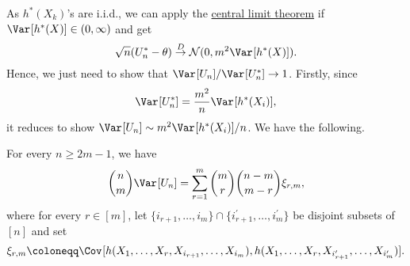 As \(h^{\ast} (X_k)\)'s are i.i.d., we can apply the \hyperref[thm:CLT]{central limit theorem} if \(\Var_{}[h^{\ast} (X)] \in (0, \infty )\) and get
\[
	\sqrt{n} (U_n^{\ast} - \theta ) \overset{D}{\to} \mathcal{N} (0, m^2 \Var_{}[h^{\ast} (X)] ).
\]
Hence, we just need to show that \(\Var_{}[U_n] / \Var_{}[U_n^{\ast} ] \to 1\). Firstly, since
\[
	\Var_{}[U_n^{\ast} ]
	= \frac{m^2}{n} \Var_{}[h^{\ast} (X_i)],
\]
it reduces to show \(\Var_{}[U_n] \sim m^2 \Var_{}[h^{\ast} (X_i)] / n\). We have the following.

\begin{proposition}\label{prop:U-statistic-variance}
	For every \(n \geq 2m - 1\), we have
	\[
		\binom{n}{m} \Var_{}[U_n]
		= \sum_{r=1}^{m} \binom{m}{r} \binom{n-m}{m-r}\xi_{r, m},
	\]
	where for every \(r \in [m]\), let \(\{ i_{r+1} , \dots , i_m\} \cap \{ i_{r+1}^{\prime} , \dots , i_m^{\prime} \} \) be disjoint subsets of \([n]\) and set
	\[
		\xi_{r, m} \coloneqq \Cov_{}[h(X_1, \dots , X_r, X_{i_{r+1}}, \dots , X_{i_m}), h(X_1, \dots , X_r, X_{i^{\prime} _{r+1}}, \dots , X_{i_m^{\prime} })].
	\]
\end{proposition}
